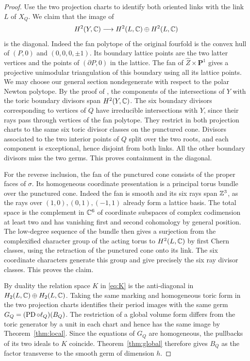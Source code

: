 \begin{proof}
Use the two projection charts to identify both oriented links with
the link $L$ of $X_Q$. We claim that the image of
\[
 H^2(Y,\mathbb C)\longrightarrow H^2(L,\mathbb C)\oplus H^2(L,\mathbb C)
\]
is the diagonal. Indeed the fan polytope of the original fourfold is
the convex hull of $(P,0)$ and $(0,0,0,\pm1)$. Its boundary lattice
points are the two latter vertices and the points of $(\partial P,0)$
in the lattice. The fan of $\widehat Z\times\mathbf P^1$ gives a
projective unimodular triangulation of this boundary using all its
lattice points. We may choose our general section nondegenerate with
respect to the polar Newton polytope. By the proof of
\cite[Theorem~4.4.2]{Bat}, the components of the intersections of $Y$
with the toric boundary divisors span $H^2(Y,\mathbb C)$. The six boundary
divisors corresponding to vertices of $Q$ have irreducible
intersections with $Y$, since their rays pass through vertices of the
fan polytope. They restrict in both projection charts to the same
six toric divisor classes on the punctured cone. Divisors associated
to the two interior points of $Q$ split over the two roots, and
each component is exceptional, hence disjoint from both links. All
the other boundary divisors miss the two germs. This proves
containment in the diagonal.

For the reverse inclusion, the fan of the punctured cone consists
of the proper faces of $\sigma$. Its homogeneous coordinate presentation
\cite[Theorem~2.1]{Cox} is a principal torus bundle over the punctured
cone. Indeed the fan is smooth and
its six rays span $\mathbb Z^3$, as the rays over $(1,0),(0,1),(-1,1)$
already form a lattice basis. The total space is the complement in
$\mathbb C^6$ of coordinate subspaces of complex codimension at least two
and has vanishing first and second cohomology by general position.
The low-degree sequence of the bundle then gives a surjection from
the complexified character group of the acting torus to $H^2(L,\mathbb C)$
by first Chern classes, using the retraction of the punctured cone
onto its link. The six coordinate characters generate this group
and give precisely the six ray divisor classes. This proves the claim.

By duality the relation space $K$ in \eqref{eq:K} is the
anti-diagonal in $H_2(L,\mathbb C)\oplus H_2(L,\mathbb C)$. Taking the same
marking and homogeneous toric form in the two projection charts
identifies their period images with the same germ
$G_Q=(\operatorname{PD}\circ\ell_Q)(B_Q)$. The restriction of a global volume form
differs from the toric generator by a unit in each chart and hence
has the same image by Theorem~\ref{thm:local}. Since the equations of $G_Q$ are
homogeneous, the pullbacks of its two ideals to $K$ coincide.
Theorem~\ref{thm:global} therefore gives $B_Q$ as the factor
transverse to the smooth germ of dimension $h$.


\end{proof}
